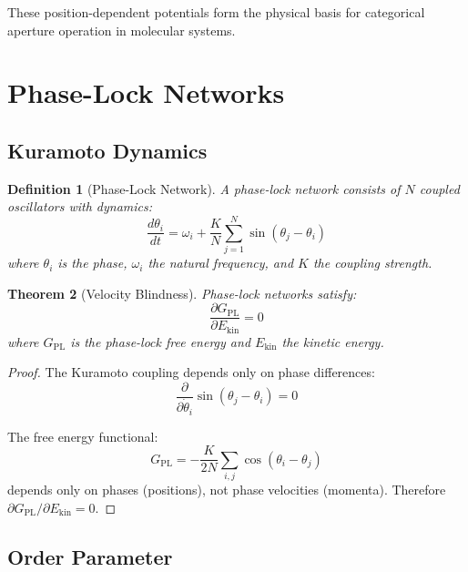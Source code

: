 \documentclass[twocolumn,amsmath,amssymb,aps,prl,superscriptaddress]{revtex4-2}
\newtheorem{theorem}{Theorem}[section]
\newtheorem{definition}[theorem]{Definition}
\newcommand{\Gfree}{G_{\text{PL}}}
\newcommand{\Ekin}{E_{\text{kin}}}
\begin{document}
These position-dependent potentials form the physical basis for categorical aperture operation in molecular systems.

\section{Phase-Lock Networks}
\label{sec:phaselock}

\subsection{Kuramoto Dynamics}

\begin{definition}[Phase-Lock Network]
A phase-lock network consists of $N$ coupled oscillators with dynamics:
\begin{equation}
\frac{d\theta_i}{dt} = \omega_i + \frac{K}{N} \sum_{j=1}^{N} \sin(\theta_j - \theta_i)
\end{equation}
where $\theta_i$ is the phase, $\omega_i$ the natural frequency, and $K$ the coupling strength.
\end{definition}

\begin{theorem}[Velocity Blindness]
\label{thm:velblind}
Phase-lock networks satisfy:
\begin{equation}
\boxed{\frac{\partial \Gfree}{\partial \Ekin} = 0}
\end{equation}
where $\Gfree$ is the phase-lock free energy and $\Ekin$ the kinetic energy.
\end{theorem}

\begin{proof}
The Kuramoto coupling depends only on phase differences:
\begin{equation}
\frac{\partial}{\partial \dot{\theta}_i} \sin(\theta_j - \theta_i) = 0
\end{equation}

The free energy functional:
\begin{equation}
\Gfree = -\frac{K}{2N} \sum_{i,j} \cos(\theta_i - \theta_j)
\end{equation}
depends only on phases (positions), not phase velocities (momenta). Therefore $\partial \Gfree / \partial \Ekin = 0$.
\end{proof}

\subsection{Order Parameter}
\end{document}
